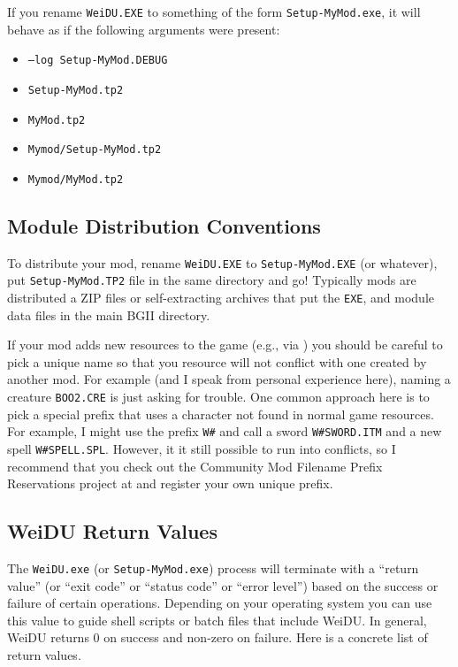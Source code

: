 \documentclass{article}
\def\ttref#1{\ahrefloc{#1}{\tt #1}}
\def\t#1{{\tt #1}}
\begin{document}
If you rename \t{WeiDU.EXE} to something of the form \t{Setup-MyMod.exe},
it will behave as if the following arguments were present:
\begin{itemize}
\item \t{--log Setup-MyMod.DEBUG}
\item \t{Setup-MyMod.tp2}
\item \t{MyMod.tp2}
\item \t{Mymod/Setup-MyMod.tp2}
\item \t{Mymod/MyMod.tp2}
\end{itemize}

\subsection{Module Distribution Conventions}

To distribute your mod, rename \t{WeiDU.EXE} to \t{Setup-MyMod.EXE} (or
whatever), put \t{Setup-MyMod.TP2} file in the same directory and go!
Typically mods are distributed a ZIP files or self-extracting archives that
put the \t{EXE}, \ttref{TP2} and module data files in the main BGII
directory.

If your mod adds new resources to the game (e.g., via \ttref{COPY}) you
should be careful to pick a unique name so that you resource will not
conflict with one created by another mod. For example (and I speak from
personal experience here), naming a creature \t{BOO2.CRE} is just asking
for trouble. One common approach here is to pick a special prefix that uses
a character not found in normal game resources. For example, I might use
the prefix \t{W\#} and call a sword \t{W\#SWORD.ITM}
and a new spell \t{W\#SPELL.SPL}. However, it it still possible to run into
conflicts, so I recommend that you check out the
Community Mod Filename Prefix Reservations project at
 and
register your own unique prefix.

\subsection{WeiDU Return Values}

The \t{WeiDU.exe} (or \t{Setup-MyMod.exe}) process will terminate with
a ``return value'' (or ``exit code'' or ``status code'' or ``error level'')
based on the success or failure of certain operations. Depending on your
operating system you can use this value to guide shell scripts or batch
files that include WeiDU. In general, WeiDU returns 0 on success and
non-zero on failure. Here is a concrete list of return values.
\end{document}
